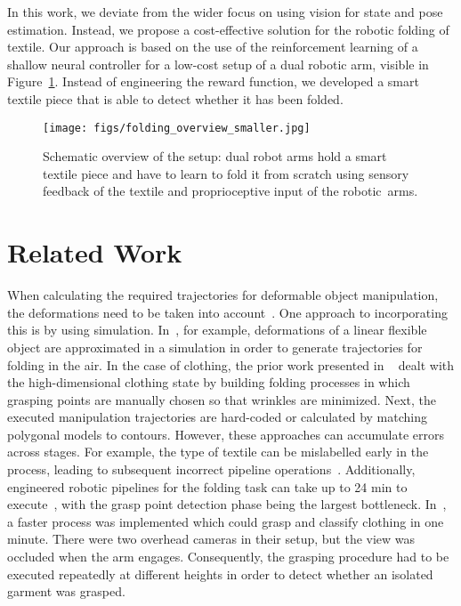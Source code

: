 \documentclass[applsci,article,accept,moreauthors,pdftex]{Definitions/mdpi}
\begin{document}
In this work, we deviate from the wider focus on using vision for state and pose estimation. Instead, we propose a cost-effective solution for the robotic folding of textile. Our approach is based on the use of the reinforcement learning of a shallow neural controller for a low-cost setup of a dual robotic arm, visible in Figure~\ref{fig:setup_overview}. Instead of engineering the reward function, we developed a smart textile piece that is able to detect whether it has been folded.
\begin{figure}[H]
\centering
\texttt{[image: figs/folding\_overview\_smaller.jpg]}
\caption{Schematic overview of the setup: dual robot arms hold a smart textile piece and have to learn to fold it from scratch using sensory feedback of the textile and proprioceptive input of the robotic~arms. }
\label{fig:setup_overview}
\end{figure}



\section{Related Work}

\label{sec:related_work}


When calculating the required trajectories for deformable object manipulation, the deformations need to be taken into account~\cite{Foresti2004}. One approach to incorporating this is by using simulation. In~\cite{Yamakawa2011}, for example, deformations of a linear flexible object are approximated in a simulation in order to generate trajectories for folding in the air. In the case of clothing, the prior work presented in ~\cite{Maitin2010,Doumanoglou2016} dealt with the high-dimensional clothing state by building folding processes in which grasping points are manually chosen so that wrinkles are minimized. Next, the executed manipulation trajectories are hard-coded or calculated by matching polygonal models to contours. However, these approaches can accumulate errors across stages. For example, the type of textile can be mislabelled early in the process, leading to subsequent incorrect pipeline operations~\cite{Doumanoglou2016}. Additionally, engineered robotic pipelines for the folding task can take up to 24 min to execute~\cite{Maitin2010}, with the grasp point detection phase being the largest bottleneck. In~\cite{Willimon2011}, a faster process was implemented which could grasp and classify clothing in one minute. There were two overhead cameras in their setup, but the view was occluded when the arm engages. Consequently, the grasping procedure had to be executed repeatedly at different heights in order to detect whether an isolated garment was grasped.\par
\end{document}

